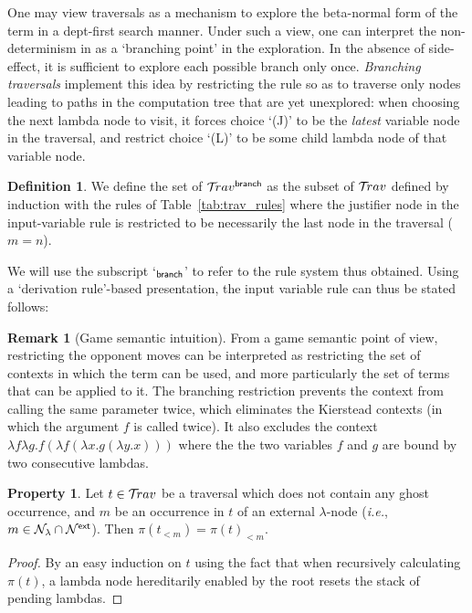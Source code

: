 \documentclass{article}
\makeatletter
\theoremstyle{definition}
\newtheorem{definition}{Definition}[section]
\newtheorem{property}{Property}[section]
\newtheorem{remark}{Remark}[section]
\newcommand\Nodes{\mathcal{N}}%
\newcommand\NodesVar{\Nodes_{\sf var}}%
\newcommand\NodesLmd{\Nodes_\lambda}%
\newcommand{\branching}{{\sf branch}}
\newcommand{\travsetbr}{{\travset^\branching}}
\newcommand{\travulc}{\travset}
\newcommand{\rulefont}[1]{\mathbf{\sf #1}}
\def\coresymbol{\pi} %
\newcommand{\core}[1]{\coresymbol(#1)} %
\newcommand{\enables}{\vdash} %
\newcommand{\ExtNodes}{\Nodes^{\sf ext}}
\renewcommand\ie{{\it i.e.\@\xspace}}
\makeatother
\begin{document}
One may view traversals as a mechanism to explore the beta-normal form of the term in a dept-first search manner. Under such a view, one can interpret the non-determinism in  as a `branching point' in the exploration. In the absence of side-effect, it is sufficient to explore each possible branch only once. \emph{Branching traversals} implement this idea by restricting the rule  so as to traverse only nodes leading to paths in the computation tree that are yet unexplored: when choosing the next lambda node to visit, it forces choice `(J)' to be the \emph{latest} variable node in the traversal, and restrict choice `(L)' to be some child lambda node of that variable node.

\begin{definition}
\label{dfn:branching_traversals}
We define the set of  $\travsetbr$ as the subset of $\travulc$ defined by induction with the rules of Table~\ref{tab:trav_rules} where the justifier node in the
input-variable rule  is restricted to be necessarily the last node in the traversal ($m=n$).

We will use the subscript `${}_\branching$' to refer to the rule system thus obtained. Using a `derivation rule'-based presentation, the input variable rule can thus be stated follows:
\infrule[$\rulefont{IVar_\branching}$]
     {t \cdot n \in\travsetbr
      \andalso n \in\ExtNodes \inter\NodesVar
      \andalso n \enables_i \alpha
      \andalso i \geq 1
     }
     { \in \travsetbr}
\end{definition}

\begin{remark}[Game semantic intuition]
From a game semantic point of view, restricting the opponent moves can be interpreted as restricting the set of contexts in which the term can be used, and more particularly the set of terms that can be applied to it.
The branching restriction prevents the context from calling the same parameter twice, which eliminates the Kierstead contexts (in which the argument $f$ is called twice). It also excludes the context $\lambda f \lambda g . f (\lambda f (\lambda x . g (\lambda y . x)))$ where the the two variables $f$ and $g$ are bound by two consecutive lambdas.
\end{remark}

\begin{property}
\label{prop:core_truncation_at_externallambda}
Let $t\in\travulc$ be a traversal which does not contain any ghost occurrence, and $m$ be an occurrence in $t$ of an external $\lambda$-node (\ie, $m \in \NodesLmd\inter\ExtNodes$). Then $\core{t_{<m}} = \core{t}_{<m}$.
\end{property}
\begin{proof}
By an easy induction on $t$ using the fact that when recursively calculating $\coresymbol(t)$, a lambda node hereditarily enabled by the root resets the stack of pending lambdas.
\end{proof}
\end{document}
